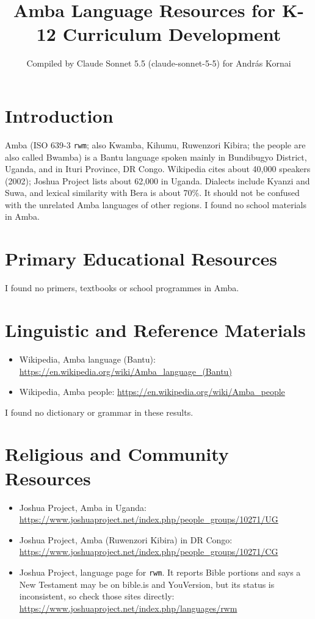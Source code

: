 \documentclass[12pt]{article}
\title{Amba Language Resources for K-12 Curriculum Development}
\author{Compiled by Claude Sonnet 5.5 (claude-sonnet-5-5) for Andr\'as Kornai}
\date{}
\begin{document}
\maketitle

\section{Introduction}
Amba (ISO 639-3 \texttt{rwm}; also Kwamba, Kihumu, Ruwenzori Kibira; the people are also called Bwamba) is a Bantu language spoken mainly in Bundibugyo District, Uganda, and in Ituri Province, DR Congo. Wikipedia cites about 40,000 speakers (2002); Joshua Project lists about 62,000 in Uganda. Dialects include Kyanzi and Suwa, and lexical similarity with Bera is about 70\%. It should not be confused with the unrelated Amba languages of other regions. I found no school materials in Amba.

\section{Primary Educational Resources}
I found no primers, textbooks or school programmes in Amba.

\section{Linguistic and Reference Materials}
\begin{itemize}
\item Wikipedia, Amba language (Bantu): \url{https://en.wikipedia.org/wiki/Amba_language_(Bantu)}
\item Wikipedia, Amba people: \url{https://en.wikipedia.org/wiki/Amba_people}
\end{itemize}
I found no dictionary or grammar in these results.

\section{Religious and Community Resources}
\begin{itemize}
\item Joshua Project, Amba in Uganda: \url{https://www.joshuaproject.net/index.php/people_groups/10271/UG}
\item Joshua Project, Amba (Ruwenzori Kibira) in DR Congo: \url{https://www.joshuaproject.net/index.php/people_groups/10271/CG}
\item Joshua Project, language page for \texttt{rwm}. It reports Bible portions and says a New Testament may be on bible.is and YouVersion, but its status is inconsistent, so check those sites directly: \url{https://www.joshuaproject.net/index.php/languages/rwm}
\end{itemize}
\end{document}
